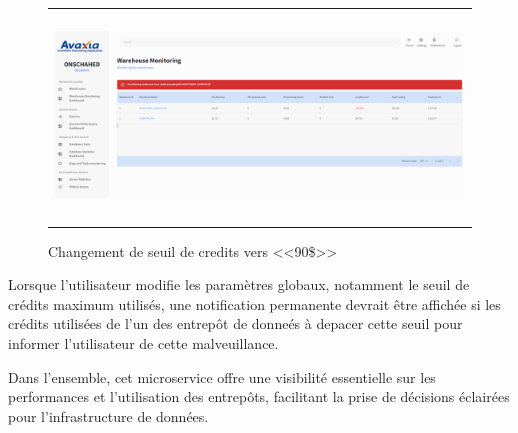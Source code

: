 \begin{itemize}
\begin{enumerate}
\begin{figure}[H]
\begin{tabular}[b]{c}
                        \end{tabular} 
                        \begin{tabular}[b]{c}
                        \includegraphics[width=.7\linewidth, height=5.5cm]{img/captures/warehouse/90.png} \\
                        
                        \end{tabular}
                        \caption{Changement de seuil de credits vers <<90\$>>                    }
                    \end{figure}
                    \par Lorsque l'utilisateur modifie les paramètres globaux, notamment le seuil de crédits maximum utilisés, une notification permanente devrait être affichée si les crédits utilisées de l'un des entrepôt de donneés à depacer cette seuil pour informer l'utilisateur de cette malveuillance.
            \end{enumerate}

\end{itemize}
\par Dans l'ensemble, cet microservice offre une visibilité essentielle sur les performances et l'utilisation des entrepôts, facilitant la prise de décisions éclairées pour l'infrastructure de données.
